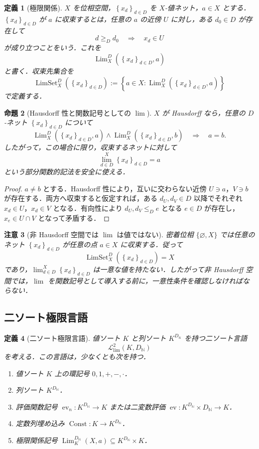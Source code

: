 \documentclass[a4paper,11pt]{ltjsarticle}
\theoremstyle{jpdef}
\newtheorem{definition}{定義}[section]
\newtheorem{warning}[definition]{注意}
\theoremstyle{jpthm}
\newtheorem{proposition}[definition]{命題}
\newcommand{\N}{\mathbb{N}}
\newcommand{\Lang}{\mathcal L}
\newcommand{\Const}{\operatorname{Const}}
\newcommand{\Lim}{\operatorname{Lim}}
\newcommand{\LimSet}{\operatorname{LimSet}}
\newcommand{\DN}{D_{\N}}
\newcommand{\set}[1]{\left\{#1\right\}}
\newcommand{\seq}[2]{\left\{#1\right\}_{#2}}
\begin{document}
\begin{definition}[極限関係]
\(X\) を位相空間，\(\seq{x_d}{d\in D}\) を \(X\)-値ネット，\(a\in X\) とする．\(\seq{x_d}{d\in D}\) が \(a\) に収束するとは，任意の \(a\) の近傍 \(U\) に対し，ある \(d_0\in D\) が存在して
\[
  d\ge_D d_0\quad\Longrightarrow\quad x_d\in U
\]
が成り立つことをいう．これを
\[
  \Lim_X^D(\seq{x_d}{d\in D},a)
\]
と書く．収束先集合を
\[
  \LimSet_X^D(\seq{x_d}{d\in D})
  :=\set{a\in X:\Lim_X^D(\seq{x_d}{d\in D},a)}
\]
で定義する．
\end{definition}

\begin{proposition}[Hausdorff 性と関数記号としての \(\lim\)]
\(X\) が Hausdorff なら，任意の \(D\)-ネット \(\seq{x_d}{d\in D}\) について
\[
  \Lim_X^D(\seq{x_d}{d\in D},a)\land
  \Lim_X^D(\seq{x_d}{d\in D},b)
  \quad\Longrightarrow\quad
  a=b.
\]
したがって，この場合に限り，収束するネットに対して
\[
  \lim_{d\in D}^{X}\seq{x_d}{d\in D}=a
\]
という部分関数的記法を安全に使える．
\end{proposition}

\begin{proof}
\(a\ne b\) とする．Hausdorff 性により，互いに交わらない近傍 \(U\ni a\)，\(V\ni b\) が存在する．両方へ収束すると仮定すれば，ある \(d_U,d_V\in D\) 以降でそれぞれ \(x_d\in U\)，\(x_d\in V\) となる．有向性により \(d_U,d_V\le_D e\) となる \(e\in D\) が存在し，\(x_e\in U\cap V\) となって矛盾する．
\end{proof}

\begin{warning}[非 Hausdorff 空間では \(\lim\) は値ではない]
密着位相 \(\{\varnothing,X\}\) では任意のネット \(\seq{x_d}{d\in D}\) が任意の点 \(a\in X\) に収束する．従って
\[
  \LimSet_X^D(\seq{x_d}{d\in D})=X
\]
であり，\(\lim_{d\in D}^{X}\seq{x_d}{d\in D}\) は一意な値を持たない．したがって非 Hausdorff 空間では，\(\lim\) を関数記号として導入する前に，一意性条件を確認しなければならない．
\end{warning}

\subsection{二ソート極限言語}

\begin{definition}[二ソート極限言語]
値ソート \(K\) と列ソート \(K^{\DN}\) を持つ二ソート言語
\[
  \Lang_{\mathrm{lim}}^{2}(K,\DN)
\]
を考える．この言語は，少なくとも次を持つ．
\begin{enumerate}
\item 値ソート \(K\) 上の環記号 \(0,1,+,-,\cdot\)．
\item 列ソート \(K^{\DN}\)．
\item 評価関数記号 \(\operatorname{ev}_n:K^{\DN}\to K\) または二変数評価 \(\operatorname{ev}:K^{\DN}\times\DN\to K\)．
\item 定数列埋め込み \(\Const:K\to K^{\DN}\)．
\item 極限関係記号 \(\Lim_K^{\DN}(X,a)\subseteq K^{\DN}\times K\)．
\end{enumerate}
\end{definition}
\end{document}
